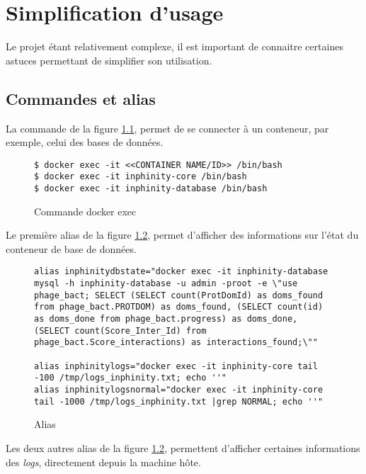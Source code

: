 \chapter{Simplification d'usage}
\label{ch:simple}

Le projet étant relativement complexe, il est important de connaitre certaines astuces permettant de simplifier son utilisation.

\section{Commandes et alias}

La commande de la figure \ref{fig:cmdDockerExec}, permet de se connecter à un conteneur, par exemple, celui des bases de données.

\begin{figure}[H] 
\centering 
\begin{lstlisting}[frame=single]
$ docker exec -it <<CONTAINER NAME/ID>> /bin/bash
$ docker exec -it inphinity-core /bin/bash
$ docker exec -it inphinity-database /bin/bash
\end{lstlisting} 
\caption[Code - Commande docker exec]{Commande docker exec}
\label{fig:cmdDockerExec} 
\end{figure}

Le première alias de la figure \ref{fig:aliases}, permet d'afficher des informations sur l'état du conteneur de base de données.

\begin{figure}[H] 
\centering 
\begin{lstlisting}[frame=single]
alias inphinitydbstate="docker exec -it inphinity-database mysql -h inphinity-database -u admin -proot -e \"use phage_bact; SELECT (SELECT count(ProtDomId) as doms_found from phage_bact.PROTDOM) as doms_found, (SELECT count(id) as doms_done from phage_bact.progress) as doms_done, (SELECT count(Score_Inter_Id) from phage_bact.Score_interactions) as interactions_found;\""

alias inphinitylogs="docker exec -it inphinity-core tail -100 /tmp/logs_inphinity.txt; echo ''"
alias inphinitylogsnormal="docker exec -it inphinity-core tail -1000 /tmp/logs_inphinity.txt |grep NORMAL; echo ''"
\end{lstlisting} 
\caption[Code - Alias]{Alias}
\label{fig:aliases} 
\end{figure}

Les deux autres alias de la figure \ref{fig:aliases}, permettent d'afficher certaines informations des \emph{logs}, directement depuis la machine hôte.


